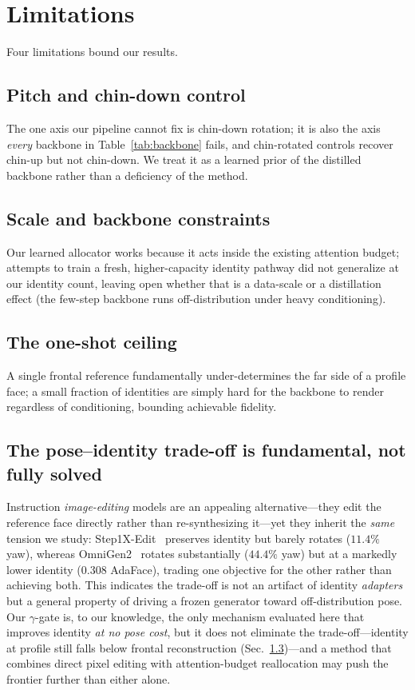 \chapter{Limitations}
\label{sec:limitations}
Four limitations bound our results.

\section{Pitch and chin-down control}
\label{sec:lim-pitch}
The one axis our pipeline cannot fix is chin-down rotation; it is also the axis
\emph{every} backbone in Table~\ref{tab:backbone} fails, and chin-rotated
controls recover chin-up but not chin-down. We treat it as a learned prior of
the distilled backbone rather than a deficiency of the method.

\section{Scale and backbone constraints}
\label{sec:lim-scale}
Our learned allocator works because it acts
inside the existing attention budget; attempts to train a fresh, higher-capacity
identity pathway did not generalize at our identity count, leaving open whether
that is a data-scale or a distillation effect (the few-step backbone runs
off-distribution under heavy conditioning).

\section{The one-shot ceiling}
\label{sec:lim-oneshot}
A single frontal reference fundamentally under-determines the far side of a profile
face; a small fraction of identities are simply hard for the backbone to render
regardless of conditioning, bounding achievable fidelity.

\section{The pose--identity trade-off is fundamental, not fully solved}
\label{sec:lim-tradeoff}
Instruction \emph{image-editing} models are an appealing alternative---they edit
the reference face directly rather than re-synthesizing it---yet they inherit the
\emph{same} tension we study: Step1X-Edit~\cite{step1xedit} preserves identity but
barely rotates ($11.4\%$ yaw), whereas OmniGen2~\cite{omnigen2} rotates
substantially ($44.4\%$ yaw) but at a markedly lower identity ($0.308$ AdaFace),
trading one objective for the other rather than achieving both. This indicates the
trade-off is not an artifact of identity \emph{adapters} but a general property of
driving a frozen generator toward off-distribution pose. Our $\gamma$-gate is, to
our knowledge, the only mechanism evaluated here that improves identity \emph{at no
pose cost}, but it does not eliminate the trade-off---identity at profile still
falls below frontal reconstruction (Sec.~\ref{sec:lim-oneshot})---and a method that
combines direct pixel editing with attention-budget reallocation may push the
frontier further than either alone.

